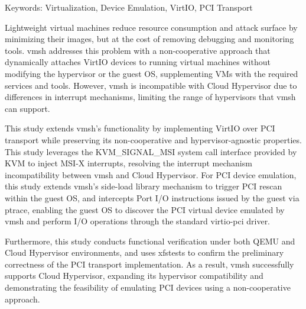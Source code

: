 \begin{EnAbstract}
    \begin{EnAbstractItems}
        \noindent \text Keywords: Virtualization, Device Emulation, VirtIO, PCI Transport

    \end{EnAbstractItems}

    \begin{EnAbstractDescription}
        Lightweight virtual machines reduce resource consumption and attack surface by minimizing their images, but at the cost of removing debugging and monitoring tools. vmsh addresses this problem with a non-cooperative approach that dynamically attaches VirtIO devices to running virtual machines without modifying the hypervisor or the guest OS, supplementing VMs with the required services and tools. However, vmsh is incompatible with Cloud Hypervisor due to differences in interrupt mechanisms, limiting the range of hypervisors that vmsh can support.

        This study extends vmsh's functionality by implementing VirtIO over PCI transport while preserving its non-cooperative and hypervisor-agnostic properties. This study leverages the KVM\_SIGNAL\_MSI system call interface provided by KVM to inject MSI-X interrupts, resolving the interrupt mechanism incompatibility between vmsh and Cloud Hypervisor. For PCI device emulation, this study extends vmsh's side-load library mechanism to trigger PCI rescan within the guest OS, and intercepts Port I/O instructions issued by the guest via ptrace, enabling the guest OS to discover the PCI virtual device emulated by vmsh and perform I/O operations through the standard virtio-pci driver.

        Furthermore, this study conducts functional verification under both QEMU and Cloud Hypervisor environments, and uses xfstests to confirm the preliminary correctness of the PCI transport implementation. As a result, vmsh successfully supports Cloud Hypervisor, expanding its hypervisor compatibility and demonstrating the feasibility of emulating PCI devices using a non-cooperative approach.
    \end{EnAbstractDescription}

\end{EnAbstract}
